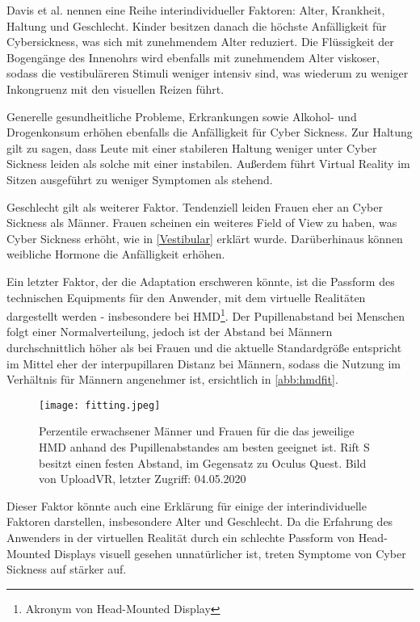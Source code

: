 Davis et al.\cite{Davis:2014:Factors} nennen eine Reihe interindividueller Faktoren: Alter, Krankheit, Haltung und Geschlecht. Kinder besitzen danach die h\"ochste Anf\"alligkeit f\"ur Cybersickness, was sich mit zunehmendem Alter reduziert. Die Fl\"ussigkeit der Bogeng\"ange des Innenohrs wird ebenfalls mit zunehmendem Alter viskoser, sodass die vestibul\"areren Stimuli weniger intensiv sind, was wiederum zu weniger Inkongruenz mit den visuellen Reizen f\"uhrt.

Generelle gesundheitliche Probleme, Erkrankungen sowie Alkohol- und Drogenkonsum\cite{Kruk:1992:Drugs} erh\"ohen ebenfalls die Anf\"alligkeit f\"ur Cyber Sickness. Zur Haltung gilt zu sagen, dass Leute mit einer stabileren Haltung weniger unter Cyber Sickness leiden als solche mit einer instabilen. Au{\ss}erdem f\"uhrt Virtual Reality im Sitzen ausgef\"uhrt zu weniger Symptomen als stehend.

Geschlecht gilt als weiterer Faktor. Tendenziell leiden Frauen eher an Cyber Sickness als M\"anner\cite{Aldaba:2019:VRNTread}. Frauen scheinen ein weiteres Field of View zu haben, was Cyber Sickness erh\"oht, wie in \autoref{Vestibular} erkl\"art wurde. Dar\"uberhinaus k\"onnen weibliche Hormone die Anf\"alligkeit erh\"ohen\cite{Kolasinski:1995:control}.

Ein letzter Faktor, der die Adaptation erschweren k\"onnte, ist die Passform des technischen Equipments f\"ur den Anwender, mit dem virtuelle Realit\"aten dargestellt werden - insbesondere bei HMD\footnote{Akronym von Head-Mounted Display}. Der Pupillenabstand bei Menschen folgt einer Normalverteilung, jedoch ist der Abstand bei M\"annern durchschnittlich h\"oher als bei Frauen und die aktuelle Standardgr\"o{\ss}e entspricht im Mittel eher der interpupillaren Distanz bei M\"annern\cite{UploadVR:2020:HMDfit}, sodass die Nutzung im Verh\"altnis f\"ur M\"annern angenehmer ist, ersichtlich in \autoref{abb:hmdfit}. 

\begin{figure}[h]
	\centering 	
	\texttt{[image: fitting.jpeg]}
	\caption{Perzentile erwachsener M\"anner und Frauen f\"ur die das jeweilige HMD anhand des Pupillenabstandes am besten geeignet ist. Rift S besitzt einen festen Abstand, im Gegensatz zu Oculus Quest. Bild von UploadVR\cite{UploadVR:2020:HMDfit}, letzter Zugriff: 04.05.2020}
	\label{abb:hmdfit}
\end{figure}

Dieser Faktor k\"onnte auch eine Erkl\"arung f\"ur einige der interindividuelle Faktoren darstellen, insbesondere Alter und Geschlecht. Da die Erfahrung des Anwenders in der virtuellen Realit\"at durch ein schlechte Passform von Head-Mounted Displays visuell gesehen unnat\"urlicher ist, treten Symptome von Cyber Sickness auf st\"arker auf.





